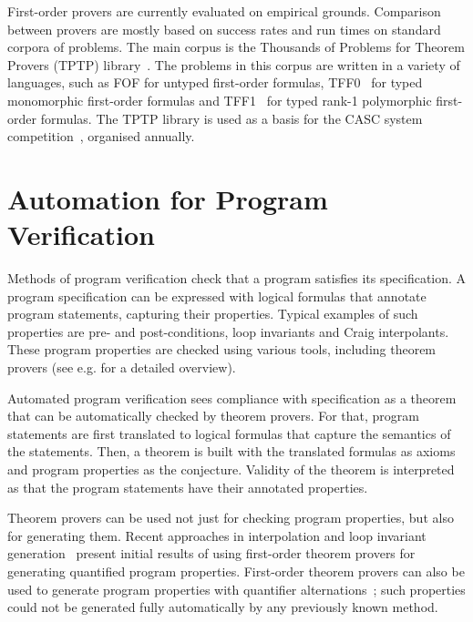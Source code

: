 First-order provers are currently evaluated on empirical grounds. Comparison between provers are mostly based on success rates and run times on standard corpora of problems. The main corpus is the Thousands of Problems for Theorem Provers (TPTP) library~\cite{TPTP}. The problems in this corpus are written in a variety of languages, such as FOF for untyped first-order formulas, TFF0~\cite{tff0} for typed monomorphic first-order formulas and TFF1~\cite{tff1} for typed rank-1 polymorphic first-order formulas. The TPTP library is used as a basis for the CASC system competition~\cite{CASC}, organised annually.




\section*{Automation for Program Verification}
\label{sect:intro:analysis}
Methods of program verification check that a program satisfies its specification. A program specification can be expressed with logical formulas that annotate program statements, capturing their properties. Typical examples of such properties are pre- and post-conditions, loop invariants and Craig interpolants. These program properties are checked using various tools, including theorem provers (see e.g. \cite{Bonacina10} for a detailed overview).

Automated program verification sees compliance with specification as a theorem that can be automatically checked by theorem provers. For that, program statements are first translated to logical formulas that capture the semantics of the statements. Then, a theorem is built with the translated formulas as axioms and program properties as the conjecture. Validity of the theorem is interpreted as that the program statements have their annotated properties.

Theorem provers can be used not just for checking program properties, but also for generating them. Recent approaches in interpolation and loop invariant generation~\cite{McMillan08,fase2009,hoder2012popl} present initial results of using first-order theorem provers for generating quantified program properties. First-order theorem provers can also be used to generate program properties with quantifier alternations~\cite{fase2009}; such properties could not be generated fully automatically by any previously known method.

